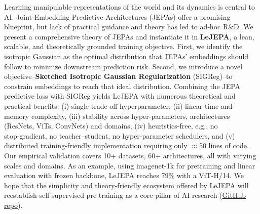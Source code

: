 \vspace{-0.2cm}
Learning manipulable representations of the world and its dynamics is central to AI. Joint-Embedding Predictive Architectures (JEPAs) offer a promising blueprint, but lack of practical guidance and theory has led to ad‑hoc R\&D. We present a comprehensive theory of JEPAs and instantiate it in {\bf LeJEPA}, a lean, scalable, and theoretically grounded training objective. First, we identify the isotropic Gaussian as the optimal distribution that JEPAs' embeddings should follow to minimize downstream prediction risk. Second, we introduce a novel objective--{\bf Sketched Isotropic Gaussian Regularization} (SIGReg)--to constrain embeddings to reach that ideal distribution. Combining the JEPA predictive loss with SIGReg yields LeJEPA with numerous theoretical and practical benefits: (i) single trade‑off hyperparameter, (ii) linear time and memory complexity, (iii) stability across hyper-parameters, architectures (ResNets, ViTs, ConvNets) and domains,  (iv) heuristics-free, e.g., no stop‑gradient, no teacher–student, no hyper-parameter schedulers, and (v) distributed training-friendly implementation requiring only $\approx$50 lines of code. Our empirical validation covers 10+ datasets, 60+ architectures, all with varying scales and domains. As an example, using imagenet-1k for pretraining and linear evaluation with frozen backbone, LeJEPA reaches 79\% with a ViT-H/14. We hope that the simplicity and theory-friendly ecosystem offered by LeJEPA will reestablish self-supervised pre-training as a core pillar of AI research (\href{https://github.com/rbalestr-lab/lejepa}{GitHub repo}).
\\[0em]
